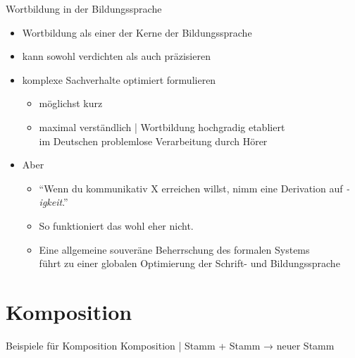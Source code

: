 \begin{frame}
  {Wortbildung in der Bildungssprache}
  \pause
  \begin{itemize}[<+->]
    \item Wortbildung als einer der Kerne der Bildungssprache
    \item kann sowohl \alert{verdichten} als auch \alert{präzisieren}
    \Halbzeile
    \item komplexe Sachverhalte \alert{optimiert} formulieren
      \begin{itemize}[<+->]
        \item möglichst kurz
        \item maximal verständlich | Wortbildung hochgradig etabliert\\
          im Deutschen  problemlose Verarbeitung durch Hörer
      \end{itemize}
      \Halbzeile
    \item Aber 
      \Halbzeile
      \begin{itemize}[<+->]
        \item "`Wenn du kommunikativ X erreichen willst, nimm eine Derivation auf \textit{-igkeit}."'
        \item So funktioniert das wohl eher nicht.
        \item Eine allgemeine souveräne \alert{Beherrschung des formalen Systems}\\
          führt zu einer globalen \alert{Optimierung der Schrift- und Bildungssprache}
      \end{itemize}
  \end{itemize}
\end{frame}


\section{Komposition}

\begin{frame}
  {Beispiele für Komposition}
  \onslide<+->
  Komposition | \alert{Stamm + Stamm → neuer Stamm}
  \Halbzeile
  \onslide<+->
  \begin{exe}
    \ex
    \begin{xlist}
      \onslide<+->
      \onslide<+->
      \onslide<+->
      \onslide<+->
      \onslide<+->
      \onslide<+->
      \onslide<+->
      \onslide<+->
    \end{xlist}
  \end{exe}
\end{frame}

